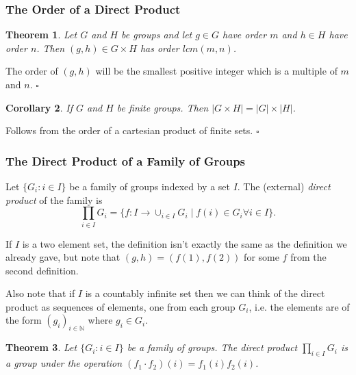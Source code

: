 \documentclass[10pt]{article}
\newtheorem{theorem}{Theorem}[section]
\newtheorem{corollary}[theorem]{Corollary}
\newenvironment{proof}[1][Proof]{\begin{trivlist}
\item[\hskip \labelsep {\itshape #1}]}{\end{trivlist}}
\newenvironment{definition}[1][Definition]{\begin{trivlist}
\item[\hskip \labelsep {\bfseries #1}]}{\end{trivlist}}
\begin{document}
\subsubsection{The Order of a Direct Product}

\begin{theorem}
Let $G$ and $H$ be groups and let $g \in G$ have order $m$ and $h \in H$ have order $n$. Then $(g, h) \in G\times H$ has order $lcm(m, n)$.
\end{theorem}

\begin{proof}
The order of $(g, h)$ will be the smallest positive integer which is a multiple of $m$ and $n$. $\square$
\end{proof}

\begin{corollary}
If $G$ and $H$ be finite groups. Then $|G\times H| = |G|\times |H|$.
\end{corollary}

\begin{proof}
Follows from the order of a cartesian product of finite sets. $\square$
\end{proof}

\subsubsection{The Direct Product of a Family of Groups}

\begin{definition}
Let $\{G_i : i \in I\}$ be a family of groups indexed by a set $I$. The (external) \emph{direct product} of the family is
$$\prod_{i \in I} G_i = \{f : I \to \cup_{i \in I} G_i \;|\; f(i) \in G_i \forall i \in I\}.$$
\end{definition}

If $I$ is a two element set, the definition isn't exactly the same as the definition we already gave, but note that $(g, h) = (f(1), f(2))$ for some $f$ from the second definition.

Also note that if $I$ is a countably infinite set then we can think of the direct product as sequences of elements, one from each group $G_i$, i.e. the elements are of the form $(g_i)_{i \in \mathbb{N}}$ where $g_i \in G_i$.

\begin{theorem}
Let $\{G_i : i \in I\}$ be a family of groups. The direct product $\prod_{i \in I} G_i$ is a group under the operation $(f_1\cdot f_2)(i) = f_1(i)f_2(i)$.
\end{theorem}
\end{document}
